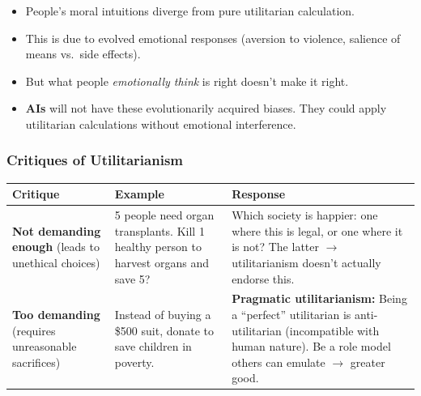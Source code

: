 \begin{thmbox}
\begin{itemize}
  \item People's moral intuitions diverge from pure utilitarian calculation.
  \item This is due to evolved emotional responses (aversion to violence, salience of means vs.\ side effects).
  \item But what people \textit{emotionally think} is right doesn't make it right.
  \item \textbf{AIs} will not have these evolutionarily acquired biases. They could apply utilitarian calculations without emotional interference.
\end{itemize}
\end{thmbox}

\bigseparator

\subsubsection{Critiques of Utilitarianism}

\begin{center}
\renewcommand{\arraystretch}{1.3}
\begin{tabular}{@{} p{4cm} p{5.5cm} p{4.5cm} @{}}
\toprule
\textbf{Critique} & \textbf{Example} & \textbf{Response} \\
\midrule
\textbf{Not demanding enough} (leads to unethical choices) & 5 people need organ transplants. Kill 1 healthy person to harvest organs and save 5? & Which society is happier: one where this is legal, or one where it is not? The latter $\to$ utilitarianism doesn't actually endorse this. \\
\textbf{Too demanding} (requires unreasonable sacrifices) & Instead of buying a \$500 suit, donate to save children in poverty. & \textbf{Pragmatic utilitarianism:} Being a ``perfect'' utilitarian is anti-utilitarian (incompatible with human nature). Be a role model others can emulate $\to$ greater good. \\
\bottomrule
\end{tabular}
\end{center}

